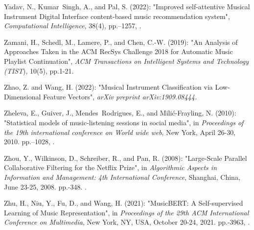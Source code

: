 \documentclass[11pt,titlepage,oneside]{book}
\begin{document}
\begin{thebibliography}{97}
	Yadav, N., Kumar~Singh, A., and Pal, S. (2022): "Improved
		self-attentive {Musical} {Instrument} {Digital} {Interface} content-based
		music recommendation system", \textit{Computational Intelligence}, 38(4),
	pp.--1257, .
	
	Zamani, H., Schedl, M., Lamere, P., and Chen, C.-W. (2019): "An
		{Analysis} of {Approaches} {Taken} in the {ACM} {RecSys} {Challenge} 2018 for
		{Automatic} {Music} {Playlist} {Continuation}", \textit{ACM Transactions on Intelligent Systems and Technology (TIST}), 10(5), pp.1-21.
	
	Zhao, Z. and Wang, H. (2022): "Musical {Instrument} {Classification}
		via {Low}-{Dimensional} {Feature} {Vectors}", \textit{arXiv preprint arXiv:1909.08444.}
	
	Zheleva, E., Guiver, J., Mendes~Rodrigues, E., and Milić-Frayling, N. (2010):
	"Statistical models of music-listening sessions in social media", in
	\textit{Proceedings of the 19th international conference on {World} wide
		web}, New York, April 26-30, 2010. pp.--1028, .
	
	Zhou, Y., Wilkinson, D., Schreiber, R., and Pan, R. (2008):
	"Large-{Scale} {Parallel} {Collaborative} {Filtering} for the
		{Netflix} {Prize}", in \textit{Algorithmic Aspects in Information and Management: 4th International Conference}, Shanghai, China, June 23-25, 2008. pp.-348.
	.
	
	Zhu, H., Niu, Y., Fu, D., and Wang, H. (2021): "{MusicBERT}: {A}
		{Self}-supervised {Learning} of {Music} {Representation}", in
	\textit{Proceedings of the 29th {ACM} {International} {Conference} on
		{Multimedia}}, New York, NY, USA, October 20-24, 2021. pp.-3963, .
	
\end{thebibliography}
\end{document}
